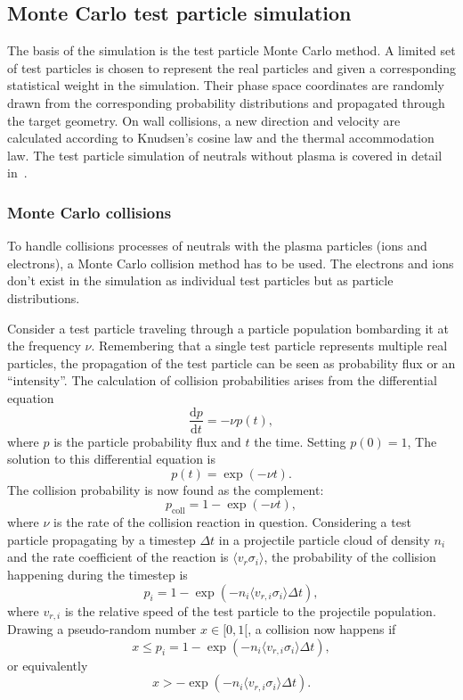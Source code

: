 \documentclass[a4paper,twoside,12pt]{article}
\begin{document}
\subsection{Monte Carlo test particle simulation}
The basis of the simulation is the test particle Monte Carlo method. A limited set of test particles is chosen to represent the real particles and given a corresponding statistical weight in the simulation. Their phase space coordinates are randomly drawn from the corresponding probability distributions and propagated through the target geometry. On wall collisions, a new direction and velocity are calculated according to Knudsen's cosine law and the thermal accommodation law. The test particle simulation of neutrals without plasma is covered in detail in~\cite{kapanen:bsc}.

\subsubsection{Monte Carlo collisions}
To handle collisions processes of neutrals with the plasma particles (ions and electrons), a Monte Carlo collision method has to be used. The electrons and ions don't exist in the simulation as individual test particles but as particle distributions.

Consider a test particle traveling through a particle population bombarding it at the frequency $\nu$. Remembering that a single test particle represents multiple real particles, the propagation of the test particle can be seen as probability flux or an ``intensity''. The calculation of collision probabilities arises from the differential equation
\begin{equation}
    \frac{\mathrm{d}p}{\mathrm{d}t} = -\nu p(t),
\end{equation}
where $p$ is the particle probability flux and $t$ the time. Setting $p(0) = 1$, The solution to this differential equation is
\[
    p(t) = \exp(-\nu t).
\]
The collision probability is now found as the complement:
\begin{equation}
    p_\text{coll} = 1 - \exp(-\nu t),
\end{equation}
where $\nu$ is the rate of the collision reaction in question. Considering a test particle propagating by a timestep $\Delta t$ in a projectile particle cloud of density $n_i$ and the rate coefficient of the reaction is $\langle v_r \sigma_i \rangle$, the probability of the collision happening during the timestep is
\begin{equation}
    p_i = 1 - \exp(-n_i \langle v_{r, i} \sigma_i \rangle \Delta t),
\end{equation}
where $v_{r, i}$ is the relative speed of the test particle to the projectile population. Drawing a pseudo-random number $x \in [0, 1[$, a collision now happens if
\[
    x \leq p_i = 1 - \exp(-n_i \langle v_{r, i} \sigma_i \rangle \Delta t),
\]
or equivalently
\[
    x > - \exp(-n_i \langle v_{r, i} \sigma_i \rangle \Delta t).
\]
\end{document}
